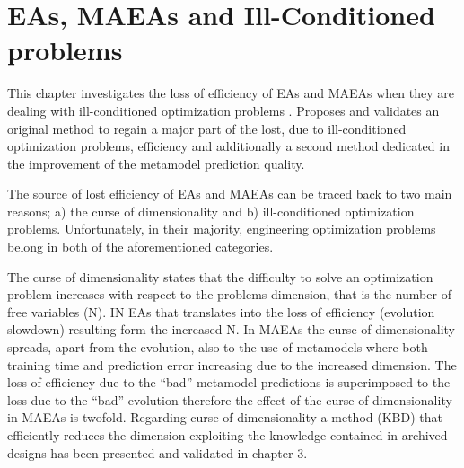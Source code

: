 \ifpdf
    \graphicspath{{4/figures/PNG/}{4/figures/PDF/}{3/figures/}}
\else
    \graphicspath{{4/figures/EPS/}{4/figures/}}
\fi

\chapter{EAs, MAEAs and Ill-Conditioned problems} %
\label{VarCorrChapter}

This chapter investigates the loss of efficiency of EAs and MAEAs when they are dealing with ill-conditioned optimization problems \cite{Salomon,Roy_2002a,Ghisu_2010}. Proposes and validates an original method to regain a major part of the lost, due to ill-conditioned optimization problems, efficiency and additionally a second method dedicated in the improvement of the metamodel prediction quality.

The source of lost efficiency of EAs and MAEAs can be traced back to two main reasons; a) the curse of dimensionality and b) ill-conditioned optimization problems.  Unfortunately, in their majority, engineering optimization problems belong in both of the aforementioned categories. 

The curse of dimensionality states that the difficulty to solve an optimization problem increases with respect to the problems dimension, that is the number of free variables (N). IN EAs that translates into the loss of efficiency (evolution slowdown) resulting form the increased N. In MAEAs the curse of dimensionality spreads, apart from the evolution, also to the use of metamodels where both training time and prediction error increasing due to the increased dimension. The loss of efficiency due to the ``bad'' metamodel predictions is superimposed to the loss due to the ``bad'' evolution therefore the effect of the curse of dimensionality in MAEAs is twofold.  Regarding curse of dimensionality a method (KBD) that efficiently reduces the dimension exploiting the knowledge contained in archived designs has been presented and validated in chapter 3.             

